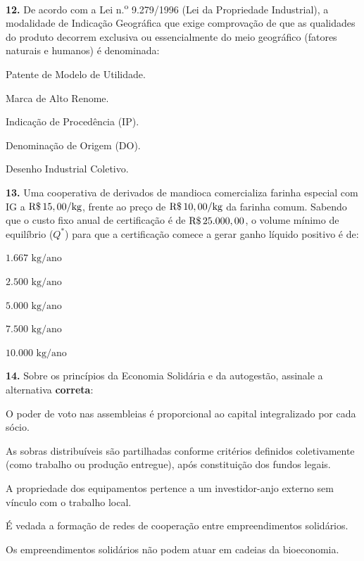 \textbf{12.} De acordo com a Lei n.\textsuperscript{o} 9.279/1996 (Lei da Propriedade Industrial), a modalidade de Indicação Geográfica que exige comprovação de que as qualidades do produto decorrem exclusiva ou essencialmente do meio geográfico (fatores naturais e humanos) é denominada:
\begin{alternativas}
  \item Patente de Modelo de Utilidade.
  \item Marca de Alto Renome.
  \item Indicação de Procedência (IP).
  \item Denominação de Origem (DO).
  \item Desenho Industrial Coletivo.
\end{alternativas}

\textbf{13.} Uma cooperativa de derivados de mandioca comercializa farinha especial com IG a $\text{R\$\,}{15,00}/\text{kg}$, frente ao preço de $\text{R\$\,}{10,00}/\text{kg}$ da farinha comum. Sabendo que o custo fixo anual de certificação é de $\text{R\$\,}{25.000,00}$, o volume mínimo de equilíbrio ($Q^*$) para que a certificação comece a gerar ganho líquido positivo é de:
\begin{alternativas}
  \item $1.667\text{ kg/ano}$
  \item $2.500\text{ kg/ano}$
  \item $5.000\text{ kg/ano}$
  \item $7.500\text{ kg/ano}$
  \item $10.000\text{ kg/ano}$
\end{alternativas}

\textbf{14.} Sobre os princípios da Economia Solidária e da autogestão, assinale a alternativa \textbf{correta}:
\begin{alternativas}
  \item O poder de voto nas assembleias é proporcional ao capital integralizado por cada sócio.
  \item As sobras distribuíveis são partilhadas conforme critérios definidos coletivamente (como trabalho ou produção entregue), após constituição dos fundos legais.
  \item A propriedade dos equipamentos pertence a um investidor-anjo externo sem vínculo com o trabalho local.
  \item É vedada a formação de redes de cooperação entre empreendimentos solidários.
  \item Os empreendimentos solidários não podem atuar em cadeias da bioeconomia.
\end{alternativas}

